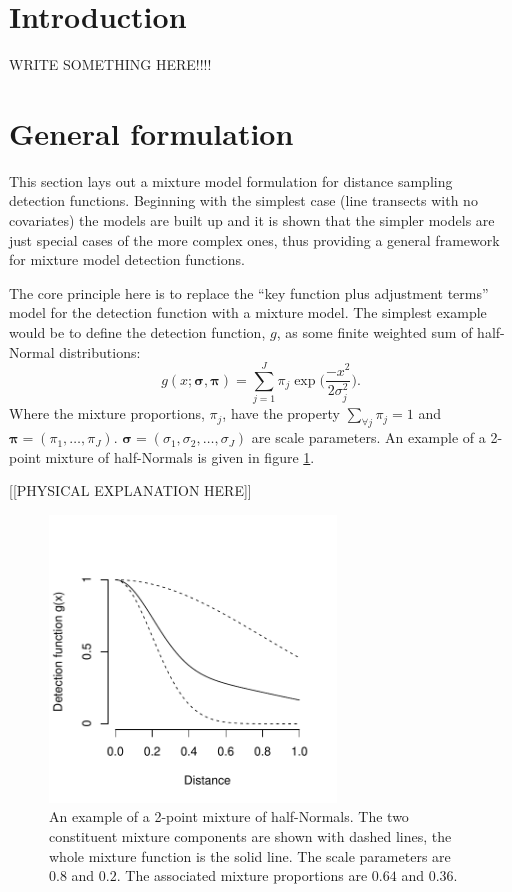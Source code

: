 \section{Introduction}

WRITE SOMETHING HERE!!!!






\section{General formulation}

This section lays out a mixture model formulation for distance sampling detection functions. Beginning with the simplest case (line transects with no covariates) the models are built up and it is shown that the simpler models are just special cases of the more complex ones, thus providing a general framework for mixture model detection functions.

The core principle here is to replace the ``key function plus adjustment terms'' model for the detection function with a mixture model. The simplest example would be to define the detection function, $g$, as some finite weighted sum of half-Normal distributions:
\begin{equation}
g(x;\bm{\sigma},\bm{\pi}) = \sum_{j=1}^J \pi_j \exp \Big( \frac{-x^2}{2 \sigma_j^2}\Big).
\label{mmds-simplemix}
\end{equation}
Where the mixture proportions, $\pi_j$, have the property $\sum_{\forall j}\pi_j=1$ and $\bm{\pi} = (\pi_1, \dots, \pi_J)$. $\bm{\sigma}=(\sigma_1,\sigma_2,\dots,\sigma_J)$ are scale parameters. An example of a 2-point mixture of half-Normals is given in figure \ref{2ptdia}.

[[PHYSICAL EXPLANATION HERE]]

\begin{figure}
\centering
\includegraphics[width=3in]{mix/figs/2ptdia.pdf}
\caption{An example of a 2-point mixture of half-Normals. The two constituent mixture components are shown with dashed lines, the whole mixture function is the solid line. The scale parameters are $0.8$ and $0.2$. The associated mixture proportions are $0.64$ and $0.36$.}
\label{2ptdia}
\end{figure}

